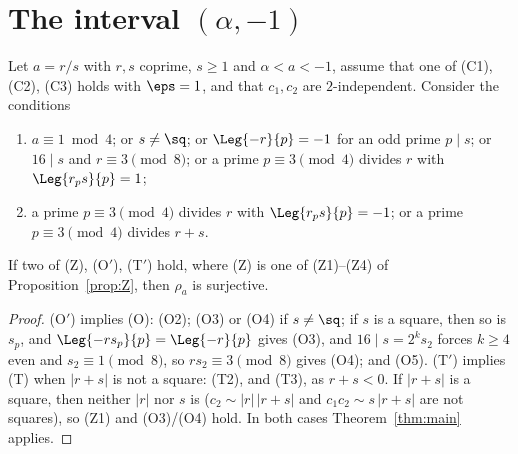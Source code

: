 \section{\texorpdfstring{The interval $(\alpha, -1)$}{The interval (alpha, -1)}}

\begin{corollary}
  \label{cor:interval}
  \leanok
  Let $a = r/s$ with $r, s$ coprime, $s \ge 1$ and $\alpha < a < -1$, assume that one of (C1),
  (C2), (C3) holds with $\eps = 1$, and that $c_1, c_2$ are $2$-independent. Consider the
  conditions
  \begin{enumerate}
    \item[(O$'$)] $a \equiv 1 \bmod 4$; or $s \ne \sq$; or $\Leg{-r}{p} = -1$ for an odd prime
          $p \mid s$; or $16 \mid s$ and $r \equiv 3 \pmod 8$; or a prime $p \equiv 3 \pmod 4$
          divides $r$ with $\Leg{r_p s}{p} = 1$;
    \item[(T$'$)] a prime $p \equiv 3 \pmod 4$ divides $r$ with $\Leg{r_p s}{p} = -1$; or a prime
          $p \equiv 3 \pmod 4$ divides $r + s$.
  \end{enumerate}
  If two of (Z), (O$'$), (T$'$) hold, where (Z) is one of (Z1)--(Z4) of
  Proposition~\ref{prop:Z}, then $\rho_a$ is surjective.
\end{corollary}
\begin{proof}
  \leanok
  (O$'$) implies (O): (O2); (O3) or (O4) if $s \ne \sq$; if $s$ is a square, then so is $s_p$,
  and $\Leg{-r s_p}{p} = \Leg{-r}{p}$ gives (O3), and $16 \mid s = 2^k s_2$ forces $k \ge 4$ even
  and $s_2 \equiv 1 \pmod 8$, so $r s_2 \equiv 3 \pmod 8$ gives (O4); and (O5). (T$'$) implies
  (T) when $|r + s|$ is not a square: (T2), and (T3), as $r + s < 0$. If $|r + s|$ is a square,
  then neither $|r|$ nor $s$ is ($c_2 \sim |r|\,|r + s|$ and $c_1 c_2 \sim s\,|r + s|$ are not
  squares), so (Z1) and (O3)/(O4) hold. In both cases Theorem~\ref{thm:main} applies.
\end{proof}

